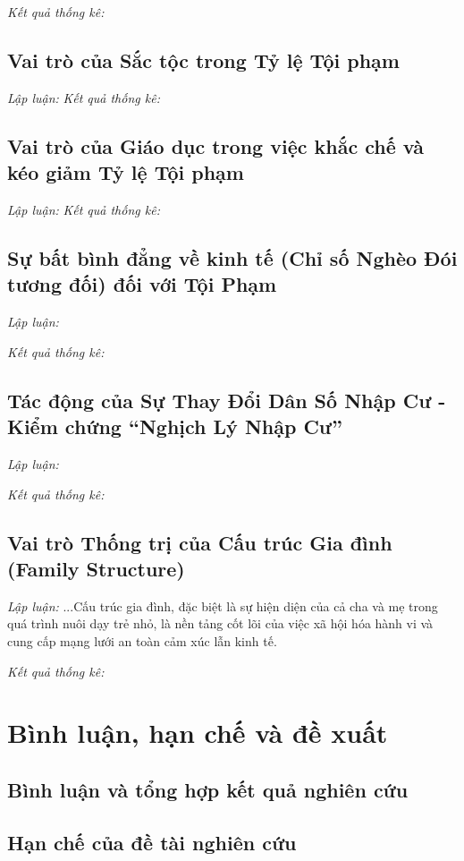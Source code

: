 \documentclass[conference]{IEEEtran}
\begin{document}
\textit{Kết quả thống kê:}

\subsection{Vai trò của Sắc tộc trong Tỷ lệ Tội phạm}
\textit{Lập luận:} 
\textit{Kết quả thống kê:}

\subsection{Vai trò của Giáo dục trong việc khắc chế và kéo giảm Tỷ lệ Tội phạm}
\textit{Lập luận:}
\textit{Kết quả thống kê:}

\subsection{Sự bất bình đẳng về kinh tế (Chỉ số Nghèo Đói tương đối) đối với Tội Phạm}
\textit{Lập luận:}

\textit{Kết quả thống kê:}

\subsection{Tác động của Sự Thay Đổi Dân Số Nhập Cư - Kiểm chứng ``Nghịch Lý Nhập Cư''}
\textit{Lập luận:}

\textit{Kết quả thống kê:} 

\subsection{Vai trò Thống trị của Cấu trúc Gia đình (Family Structure)}
\textit{Lập luận:} ...Cấu trúc gia đình, đặc biệt là sự hiện diện của cả cha và mẹ trong quá trình nuôi dạy trẻ nhỏ, là nền tảng cốt lõi của việc xã hội hóa hành vi và cung cấp mạng lưới an toàn cảm xúc lẫn kinh tế.

\textit{Kết quả thống kê:}

\section{Bình luận, hạn chế và đề xuất}

\subsection{Bình luận và tổng hợp kết quả nghiên cứu}

\subsection{Hạn chế của đề tài nghiên cứu}
\end{document}
